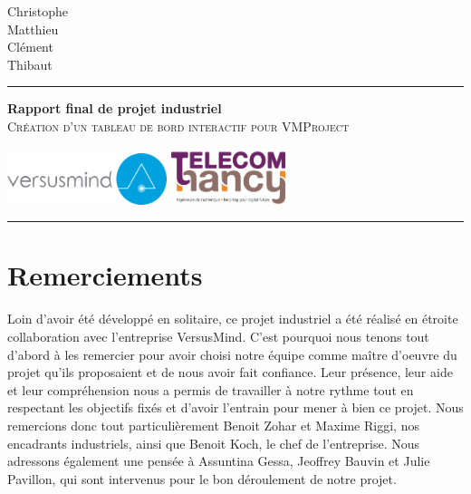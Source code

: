 \documentclass[12pt]{report}
\begin{document}

  \vfill
\begin{minipage}{0.5\textwidth}
  Christophe \\
  Matthieu \\
  Clément \\
  Thibaut \\
\end{minipage}

\vfill
  \hrule height 1.5pt
  \vskip 1cm
   \begin{center}
       {\Huge \textbf{Rapport final de projet industriel}} \\
       \vspace{0.5cm}
       \textsc{Création d'un tableau de bord interactif pour VMProject}\\
    \vspace{0.2cm} 
 
      

  \vskip 0.5cm
       \includegraphics[width=0.35\textwidth]{pictures/versusmind.png}
      \hspace{5cm}
      \includegraphics[width=0.25\textwidth]{pictures/esial.png}\\
  \vskip 1cm
  \hrule height 1.5pt
  
\end{center}
\vfill
\newpage{}

\chapter*{Remerciements}

Loin d'avoir été développé en solitaire, ce projet industriel a été réalisé en étroite collaboration avec l'entreprise VersusMind. C'est pourquoi nous tenons tout d'abord à les remercier pour avoir choisi notre équipe comme maître d'oeuvre du projet qu'ils proposaient et de nous avoir fait confiance. Leur présence, leur aide et leur compréhension nous a permis de travailler à notre rythme tout en respectant les objectifs fixés et d'avoir l'entrain pour mener à bien ce projet. Nous remercions donc tout particulièrement Benoit Zohar et Maxime Riggi, nos encadrants industriels, ainsi que Benoit Koch, le chef de l'entreprise. Nous adressons également une pensée à Assuntina Gessa, Jeoffrey Bauvin et Julie Pavillon, qui sont intervenus pour le bon déroulement de notre projet.\\
\end{document}
